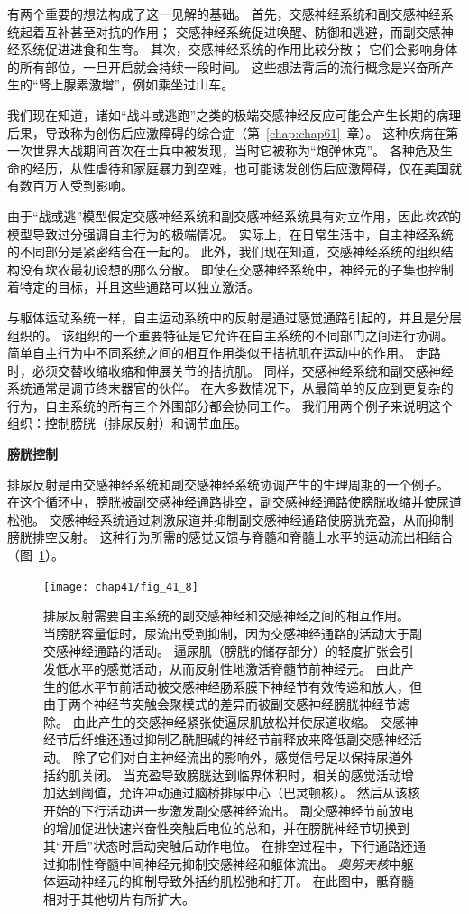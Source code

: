有两个重要的想法构成了这一见解的基础。
首先，交感神经系统和副交感神经系统起着互补甚至对抗的作用；
交感神经系统促进唤醒、防御和逃避，而副交感神经系统促进进食和生育。
其次，交感神经系统的作用比较分散；
它们会影响身体的所有部位，一旦开启就会持续一段时间。
这些想法背后的流行概念是兴奋所产生的“肾上腺素激增”，例如乘坐过山车。


我们现在知道，诸如“战斗或逃跑”之类的极端交感神经反应可能会产生长期的病理后果，导致称为创伤后应激障碍的综合症（第~\ref{chap:chap61}~章）。
这种疾病在第一次世界大战期间首次在士兵中被发现，当时它被称为“炮弹休克”。
各种危及生命的经历，从性虐待和家庭暴力到空难，也可能诱发创伤后应激障碍，仅在美国就有数百万人受到影响。


由于“战或逃”模型假定交感神经系统和副交感神经系统具有对立作用，因此\textit{坎农}的模型导致过分强调自主行为的极端情况。
实际上，在日常生活中，自主神经系统的不同部分是紧密结合在一起的。
此外，我们现在知道，交感神经系统的组织结构没有坎农最初设想的那么分散。
即使在交感神经系统中，神经元的子集也控制着特定的目标，并且这些通路可以独立激活。


与躯体运动系统一样，自主运动系统中的反射是通过感觉通路引起的，并且是分层组织的。
该组织的一个重要特征是它允许在自主系统的不同部门之间进行协调。
简单自主行为中不同系统之间的相互作用类似于拮抗肌在运动中的作用。
走路时，必须交替收缩收缩和伸展关节的拮抗肌。
同样，交感神经系统和副交感神经系统通常是调节终末器官的伙伴。
在大多数情况下，从最简单的反应到更复杂的行为，自主系统的所有三个外围部分都会协同工作。
我们用两个例子来说明这个组织：控制膀胱（排尿反射）和调节血压。


\textbf{膀胱控制}

排尿反射是由交感神经系统和副交感神经系统协调产生的生理周期的一个例子。
在这个循环中，膀胱被副交感神经通路排空，副交感神经通路使膀胱收缩并使尿道松弛。
交感神经系统通过刺激尿道并抑制副交感神经通路使膀胱充盈，从而抑制膀胱排空反射。
这种行为所需的感觉反馈与脊髓和脊髓上水平的运动流出相结合（图~\ref{fig:41_8}）。


\begin{figure}[htbp]
	\centering
	\texttt{[image: chap41/fig\_41\_8]}
	\caption{排尿反射需要自主系统的副交感神经和交感神经之间的相互作用\cite{de1993neurophysiology}。
		当膀胱容量低时，尿流出受到抑制，因为交感神经通路的活动大于副交感神经通路的活动。
		逼尿肌（膀胱的储存部分）的轻度扩张会引发低水平的感觉活动，从而反射性地激活脊髓节前神经元。
		由此产生的低水平节前活动被交感神经肠系膜下神经节有效传递和放大，但由于两个神经节突触会聚模式的差异而被副交感神经膀胱神经节滤除。
		由此产生的交感神经紧张使逼尿肌放松并使尿道收缩。
		交感神经节后纤维还通过抑制乙酰胆碱的神经节前释放来降低副交感神经活动。
		除了它们对自主神经流出的影响外，感觉信号足以保持尿道外括约肌关闭。
		当充盈导致膀胱达到临界体积时，相关的感觉活动增加达到阈值，允许冲动通过脑桥排尿中心（巴灵顿核）。
		然后从该核开始的下行活动进一步激发副交感神经流出。
		副交感神经节前放电的增加促进快速兴奋性突触后电位的总和，并在膀胱神经节切换到其“开启”状态时启动突触后动作电位。
		在排空过程中，下行通路还通过抑制性脊髓中间神经元抑制交感神经和躯体流出。
		\textit{奥努夫核}中躯体运动神经元的抑制导致外括约肌松弛和打开。
		在此图中，骶脊髓相对于其他切片有所扩大。}
	\label{fig:41_8}
\end{figure}


